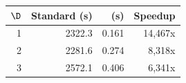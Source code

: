 \begin{tabular}{rrrr}
\hline
\(\D\) & Standard (s) & \fmsClusterFirst{} (s) & Speedup \\
\hline
1 & 2322.3 & 0.161 & 14,467x \\
2 & 2281.6 & 0.274 & 8,318x \\
3 & 2572.1 & 0.406 & 6,341x \\
\hline
\end{tabular}
